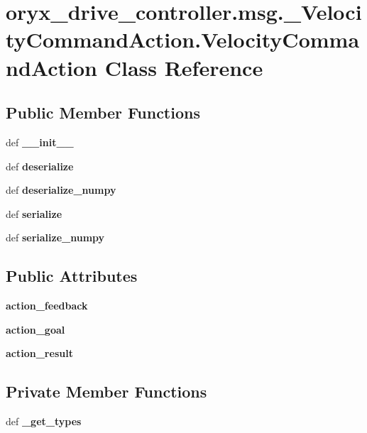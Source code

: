 \section{oryx\-\_\-drive\-\_\-controller.\-msg.\-\_\-\-Velocity\-Command\-Action.\-Velocity\-Command\-Action \-Class \-Reference}
\label{classoryx__drive__controller_1_1msg_1_1__VelocityCommandAction_1_1VelocityCommandAction}
\subsection*{\-Public \-Member \-Functions}
\begin{DoxyCompactItemize}
\item 
def {\bf \-\_\-\-\_\-init\-\_\-\-\_\-}
\item 
def {\bf deserialize}
\item 
def {\bf deserialize\-\_\-numpy}
\item 
def {\bf serialize}
\item 
def {\bf serialize\-\_\-numpy}
\end{DoxyCompactItemize}
\subsection*{\-Public \-Attributes}
\begin{DoxyCompactItemize}
\item 
{\bf action\-\_\-feedback}
\item 
{\bf action\-\_\-goal}
\item 
{\bf action\-\_\-result}
\end{DoxyCompactItemize}
\subsection*{\-Private \-Member \-Functions}
\begin{DoxyCompactItemize}
\item 
def {\bf \-\_\-get\-\_\-types}
\end{DoxyCompactItemize}
